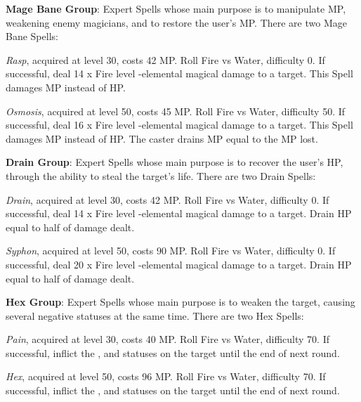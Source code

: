 \begin{multicols}{2}
    \textbf{Mage Bane Group}: Expert Spells whose main purpose is to manipulate MP, weakening enemy magicians, and to restore the user's MP\@. There are two Mage Bane Spells:
    
    \textit{Rasp}, acquired at level 30, costs 42 MP\@. Roll Fire vs Water, difficulty 0. If successful, deal 14 x Fire level -elemental magical damage to a target. This Spell damages MP instead of HP\@. 
    
    \textit{Osmosis}, acquired at level 50, costs 45 MP\@. Roll Fire vs Water, difficulty 50. If successful, deal 16 x Fire level -elemental magical damage to a target. This Spell damages MP instead of HP\@. The caster drains MP equal to the MP lost.

    \ffcrystal[type=level,height=8pt]

    \textbf{Drain Group}: Expert Spells whose main purpose is to recover the user's HP, through the ability to steal the target’s life. There are two Drain Spells:
    
    \textit{Drain}, acquired at level 30, costs 42 MP\@. Roll Fire vs Water, difficulty 0. If successful, deal 14 x Fire level -elemental magical damage to a target. Drain HP equal to half of damage dealt.
    
    \textit{Syphon}, acquired at level 50, costs 90 MP\@. Roll Fire vs Water, difficulty 0. If successful, deal 20 x Fire level -elemental magical damage to a target.  Drain HP equal to half of damage dealt.

    \ffcrystal[type=level,height=8pt]

    \textbf{Hex Group}: Expert Spells whose main purpose is to weaken the target, causing several negative statuses at the same time. There are two Hex Spells:
    
    \textit{Pain}, acquired at level 30, costs 40 MP\@. Roll Fire vs Water, difficulty 70. If successful, inflict the ,  and  statuses on the target until the end of next round.
    
    \textit{Hex}, acquired at level 50, costs 96 MP\@. Roll Fire vs Water, difficulty 70. If successful, inflict the ,  and  statuses on the target until the end of next round.


\end{multicols}

